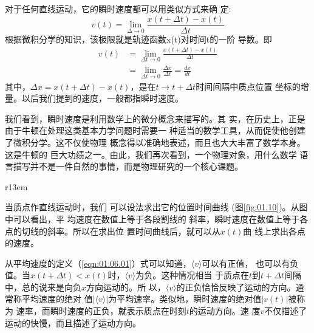 对于任何直线运动，它的瞬时速度都可以用类似方式来确
定:
\begin{equation*}
        v(t)=\lim _{\Delta \rightarrow 0} \frac{x(t+\Delta t)-x(t)}{\Delta t}
\end{equation*}
根据微积分学的知识，该极限就是轨迹函数x(t)对时间t的一阶
导数。即
\begin{equation}
    \begin{aligned}
        v(t) & =\lim _{\Delta t \rightarrow 0} \frac{x(t+\Delta t)-x(t)}{\Delta t}                            \\
             & =\lim _{\Delta t \rightarrow 0} \frac{\Delta x}{\Delta t}=\frac{d x}{d t} \label{eqn:01.06.03}
    \end{aligned}
\end{equation}
其中，$\Delta x=x(t+\Delta t)-x(t)$，是在$t\rightarrow t+\Delta t$时间间隔中质点位置
坐标的增量。以后我们提到的速度，一般都指瞬时速度。

我们看到，瞬时速度是利用数学上的微分概念来描写的。其
实，在历史上，正是由于牛顿在处理这类基本力学问题时需要一
种适当的数学工具，从而促使他创建了微积分学。这不仅使物理
概念得以准确地表述，而且也大大丰富了数学本身。这是牛顿的
巨大功绩之一。由此，我们再次看到，一个物理对象，用什么数学
语言描写并不是一件自然的事情，而是物理研究的一个核心课题。

\begin{wrapfigure}[10]{r}{13em}
    \small \vspace{-1.2em}
    \centering
    \caption{直线运动的$x-t$图}
    \label{fig:01.10}
\end{wrapfigure}
当质点作直线运动时，我们
可以设法求出它的位置时间曲线
(图\ref{fig:01.10})。从图中可以看出，平
均速度在数值上等于各段割线的
斜率，瞬时速度在数值上等于各
点的切线的斜率。所以在求出位
置时间曲线后，就可以从$x(t)$曲
线上求出各点的速度。

从平均速度的定义（\ref{eqn:01.06.01}）式可以知道，$\langle v\rangle$可以有正值，
也可以有负值。当$x(t+\Delta t)<x(t)$时，$\langle v\rangle$为负。这种情况相当
于质点在$t$到$t+\Delta t$间隔中，总的说来是向负$x$方向运动的。所
以，$\langle v\rangle$的正负恰恰反映了运动的方向。通常称平均速度的绝对
值$|\langle v\rangle|$为平均速率。类似地，瞬时速度的绝对值$|v(t)|$被称为
速率，而瞬时速度的正负，就表示质点在时刻$t$的运动方向。速
度$v$不仅描述了运动的快慢，而且描述了运动方向。